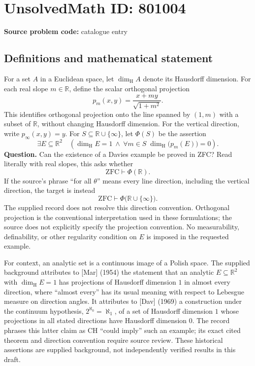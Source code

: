 \documentclass[11pt]{article}
\newcommand{\R}{\mathbb{R}}
\begin{document}
\section*{UnsolvedMath ID: 801004}
\textbf{Source problem code:} catalogue entry
\subsection{Definitions and mathematical statement}
For a set \(A\) in a Euclidean space, let \(\dim_{\mathrm H}A\) denote its Hausdorff dimension. For each real slope \(m\in\R\), define the scalar orthogonal projection
\[
p_m(x,y)=\frac{x+my}{\sqrt{1+m^2}}.
\]
This identifies orthogonal projection onto the line spanned by \((1,m)\) with a subset of \(\R\), without changing Hausdorff dimension. For the vertical direction, write \(p_\infty(x,y)=y\). For \(S\subseteq\R\cup\{\infty\}\), let \(\Phi(S)\) be the assertion
\[
\exists E\subseteq\R^2\quad
\left(\dim_{\mathrm H}E=1\ \land\
\forall m\in S\;\dim_{\mathrm H}\bigl(p_m(E)\bigr)=0\right).
\]
\textbf{Question.} Can the existence of a Davies example be proved in ZFC? Read literally with real slopes, this asks whether
\[
\mathrm{ZFC}\vdash\Phi(\R).
\]
If the source's phrase ``for all \(\theta\)'' means every line direction, including the vertical direction, the target is instead
\[
\mathrm{ZFC}\vdash\Phi\bigl(\R\cup\{\infty\}\bigr).
\]
The supplied record does not resolve this direction convention. Orthogonal projection is the conventional interpretation used in these formulations; the source does not explicitly specify the projection convention. No measurability, definability, or other regularity condition on \(E\) is imposed in the requested example.

For context, an analytic set is a continuous image of a Polish space. The supplied background attributes to [Mar] (1954) the statement that an analytic \(E\subseteq\R^2\) with \(\dim_{\mathrm H}E=1\) has projections of Hausdorff dimension \(1\) in almost every direction, where ``almost every'' has its usual meaning with respect to Lebesgue measure on direction angles. It attributes to [Dav] (1969) a construction under the continuum hypothesis, \(2^{\aleph_0}=\aleph_1\), of a set of Hausdorff dimension \(1\) whose projections in all stated directions have Hausdorff dimension \(0\). The record phrases this latter claim as CH ``could imply'' such an example; its exact cited theorem and direction convention require source review. These historical assertions are supplied background, not independently verified results in this draft.
\end{document}
